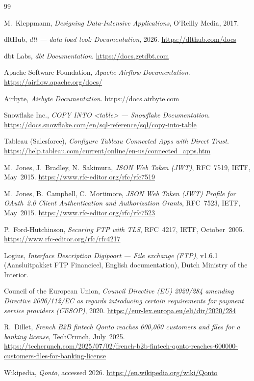 \begin{thebibliography}{99}
\small

 M.~Kleppmann, \emph{Designing Data-Intensive Applications}, O'Reilly Media, 2017.

 dltHub, \emph{dlt --- data load tool: Documentation}, 2026. \url{https://dlthub.com/docs}

 dbt Labs, \emph{dbt Documentation}. \url{https://docs.getdbt.com}

 Apache Software Foundation, \emph{Apache Airflow Documentation}. \url{https://airflow.apache.org/docs/}

 Airbyte, \emph{Airbyte Documentation}. \url{https://docs.airbyte.com}

 Snowflake Inc., \emph{COPY INTO <table> --- Snowflake Documentation}. \url{https://docs.snowflake.com/en/sql-reference/sql/copy-into-table}

 Tableau (Salesforce), \emph{Configure Tableau Connected Apps with Direct Trust}. \url{https://help.tableau.com/current/online/en-us/connected_apps.htm}

 M.~Jones, J.~Bradley, N.~Sakimura, \emph{JSON Web Token (JWT)}, RFC~7519, IETF, May~2015. \url{https://www.rfc-editor.org/rfc/rfc7519}

 M.~Jones, B.~Campbell, C.~Mortimore, \emph{JSON Web Token (JWT) Profile for OAuth~2.0 Client Authentication and Authorization Grants}, RFC~7523, IETF, May~2015. \url{https://www.rfc-editor.org/rfc/rfc7523}

 P.~Ford-Hutchinson, \emph{Securing FTP with TLS}, RFC~4217, IETF, October~2005. \url{https://www.rfc-editor.org/rfc/rfc4217}

 Logius, \emph{Interface Description Digipoort --- File exchange (FTP)}, v1.6.1 (Aansluitpakket FTP Financieel, English documentation), Dutch Ministry of the Interior.

 Council of the European Union, \emph{Council Directive (EU) 2020/284 amending Directive 2006/112/EC as regards introducing certain requirements for payment service providers (CESOP)}, 2020. \url{https://eur-lex.europa.eu/eli/dir/2020/284}

 R.~Dillet, \emph{French B2B fintech Qonto reaches 600,000 customers and files for a banking license}, TechCrunch, July~2025. \url{https://techcrunch.com/2025/07/02/french-b2b-fintech-qonto-reaches-600000-customers-files-for-banking-license}

 Wikipedia, \emph{Qonto}, accessed 2026. \url{https://en.wikipedia.org/wiki/Qonto}

\end{thebibliography}
